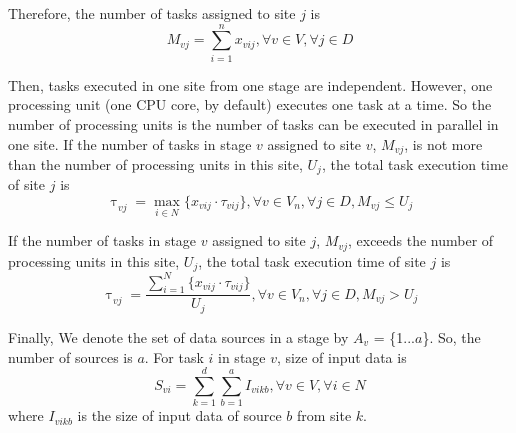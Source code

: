\documentclass[base.tex]{subfiles}
\begin{document}
Therefore, the number of tasks assigned to site $j$ is
\begin{equation}
\label{eq:the number of tasks assigned to one site in certain stage}
	M_{vj} = \displaystyle \sum_{i=1}^n x_{vij}, \forall v \in V,\forall j \in D
\end{equation}

Then, tasks executed in one site from one stage are independent. However, one processing unit (one CPU core, by default) executes one task at a time. So the number of processing units is the number of tasks can be executed in parallel in one site. If the number of tasks in stage $v$ assigned to site $v$, $M_{vj}$, is not more than the number of processing units in this site, $U_{j}$, the total task execution time of site $j$ is
\begin{equation}
\label{eq:total task execution time if tasks are fewer}
	\uptau^{}_{vj} = \max_{i \in N}\{x_{vij}\cdot\tau_{vij}\}, \forall v \in V_{n}, \forall j \in D, M_{vj}\le U_{j}
\end{equation}

If the number of tasks in stage $v$ assigned to site $j$, $M_{vj}$, exceeds the number of processing units in this site, $U_{j}$, the total task execution time of site $j$ is
\begin{equation}
\label{eq:total task execution time if tasks are more than processing units}
	\uptau^{}_{vj} = \frac{\displaystyle \sum_{i = 1}^N\{x_{vij}\cdot\tau_{vij}\}}{U_{j}}, \forall v \in V_{n}, \forall j \in D, M_{vj}>U_{j}
\end{equation}

Finally, We denote the set of data sources in a stage by $ A_{v} $ = \{1...$a$\}. So, the number of sources is $a$. For task $i$ in stage $v$, size of input data is
\begin{equation}
\label{eq:the size of intermediate data aggregated to one site in certain stage}
	S_{vi} = \displaystyle \sum_{k=1}^d \sum_{b=1}^a I_{vikb}, \forall v \in V,\forall i \in N
\end{equation}
where $I_{vikb}$ is the size of input data of source $b$ from site $k$.
\end{document}
